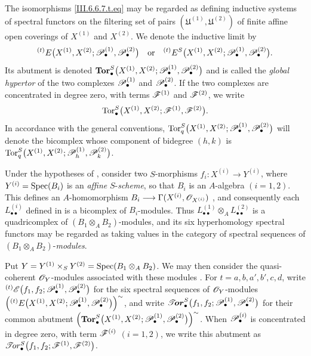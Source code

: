 \begin{env}[6.6.7]

The isomorphisms \eqref{III.6.6.7.t.eq} may be regarded as
defining inductive systems of spectral functors on the filtering
set of pairs
$(\mathfrak U^{(1)},\mathfrak U^{(2)})$ of finite affine open
coverings of $X^{(1)}$ and $X^{(2)}$.  We denote the inductive
limit by
\[
  {}^{(t)}E
  \bigl(
    X^{(1)},X^{(2)};
    \mathscr{P}_\bullet^{(1)},\mathscr{P}_\bullet^{(2)}
  \bigr)
  \quad\text{or}\quad
  {}^{(t)}E^S
  \bigl(
    X^{(1)},X^{(2)};
    \mathscr{P}_\bullet^{(1)},\mathscr{P}_\bullet^{(2)}
  \bigr).
\]
Its abutment is denoted $\mathbf{Tor}_\bullet^S
\bigl(
X^{(1)},X^{(2)};
\mathscr{P}_\bullet^{(1)},\mathscr{P}_\bullet^{(2)}
\bigr)$
and is called the \emph{global hypertor} of the two complexes
$\mathscr{P}_\bullet^{(1)}$ and $\mathscr{P}_\bullet^{(2)}$.  If the two
complexes are concentrated in degree zero, with terms
$\mathscr{F}^{(1)}$ and $\mathscr{F}^{(2)}$, we write
\[
  \operatorname{Tor}_\bullet^S
  \bigl(
    X^{(1)},X^{(2)};
    \mathscr{F}^{(1)},\mathscr{F}^{(2)}
  \bigr).
\]
In accordance with the general conventions, $\operatorname{Tor}_q^S
\bigl(
X^{(1)},X^{(2)};
\mathscr{P}_\bullet^{(1)},\mathscr{P}_\bullet^{(2)}
\bigr)$
will denote the bicomplex whose component of bidegree $(h,k)$ is $\operatorname{Tor}_q^S
\bigl(
X^{(1)},X^{(2)};
\mathscr{P}_h^{(1)},\mathscr{P}_k^{(2)}
\bigr)$.
\end{env}

\begin{env}[6.6.8]
\label{III.6.6.8}
Under the hypotheses of , consider two
$S$-morphisms $f_i:X^{(i)}\longrightarrow Y^{(i)}$,
where
$Y^{(i)}=\operatorname{Spec}(B_i)$ is an \emph{affine} $S$-\emph{scheme}, so that $B_i$ is
an $A$-algebra $(i=1,2)$.  This defines an $A$-homomorphism $B_i\longrightarrow
\Gamma(X^{(i)},\mathscr{O}_{X^{(i)}})$
, and consequently each
$L_{\bullet\bullet}^{(i)}$ defined in  is a
bicomplex of $B_i$-modules.  Thus $L_{\bullet\bullet}^{(1)}
\otimes_A L_{\bullet\bullet}^{(2)}$
is a quadricomplex of $(B_1\otimes_AB_2)$-modules, and its six
hyperhomology spectral functors may be regarded as taking values
in the category of spectral sequences of
$(B_1\otimes_AB_2)$-\emph{modules}.

Put $Y=Y^{(1)}\times_SY^{(2)}
=\operatorname{Spec}(B_1\otimes_AB_2)$.
We may then consider the quasi-coherent $\mathscr{O}_Y$-modules
associated with these modules .  For
$t=a,b,a',b',c,d$, write ${}^{(t)}\mathscr{E}
\bigl(
f_1,f_2;
\mathscr{P}_\bullet^{(1)},\mathscr{P}_\bullet^{(2)}
\bigr)$
for the six spectral sequences of $\mathscr{O}_Y$-modules $\left(
{}^{(t)}E
\bigl(
X^{(1)},X^{(2)};
\mathscr{P}_\bullet^{(1)},\mathscr{P}_\bullet^{(2)}
\bigr)
\right)^{\sim}$,
and write $\boldsymbol{\mathscr{T}\!or}_\bullet^S
\bigl(
f_1,f_2;
\mathscr{P}_\bullet^{(1)},\mathscr{P}_\bullet^{(2)}
\bigr)$
for their common abutment $\left(
\mathbf{Tor}_\bullet^S
\bigl(
X^{(1)},X^{(2)};
\mathscr{P}_\bullet^{(1)},\mathscr{P}_\bullet^{(2)}
\bigr)
\right)^{\sim}$.
When $\mathscr{P}_\bullet^{(i)}$ is concentrated in degree zero, with
term $\mathscr{F}^{(i)}$ $(i=1,2)$, we write this abutment as $\mathscr{T}\!or_\bullet^S
\bigl(
f_1,f_2;
\mathscr{F}^{(1)},\mathscr{F}^{(2)}
\bigr)$.
\end{env}



